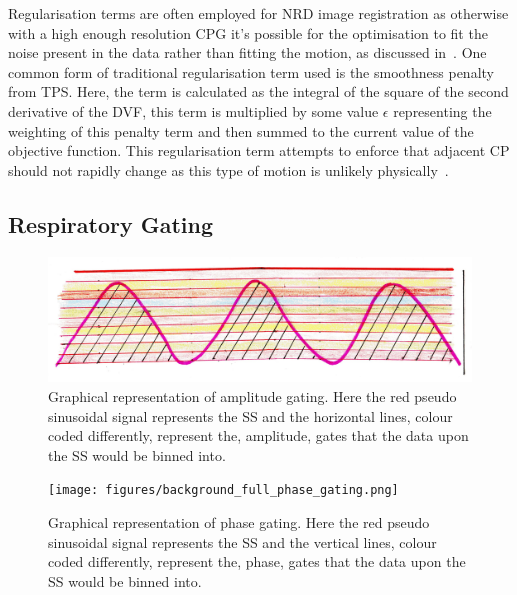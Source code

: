                 Regularisation terms are often employed for \gls{NRD} image registration as otherwise with a high enough resolution \gls{CPG} it's possible for the optimisation to fit the noise present in the data rather than fitting the motion, as discussed in~. One common form of traditional regularisation term used is the smoothness penalty from \gls{TPS}. Here, the term is calculated as the integral of the square of the second derivative of the \gls{DVF}, this term is multiplied by some value $\epsilon$ representing the weighting of this penalty term and then summed to the current value of the objective function. This regularisation term attempts to enforce that adjacent \gls{CP} should not rapidly change as this type of motion is unlikely physically~.
        
        \subsection{Respiratory Gating} \label{sec:respiratory_gating}
            
            \begin{figure}
                \centering
                    
                \includegraphics[width=1.0\linewidth]{figures/background_amplitude_gating.png}
                    
                \captionsetup{singlelinecheck=false, justification=raggedright}
                \caption{Graphical representation of amplitude gating. Here the red pseudo sinusoidal signal represents the \gls{SS} and the horizontal lines, colour coded differently, represent the, amplitude, gates that the data upon the \gls{SS} would be binned into.} \label{fig:respiratory_gating_ampliude_gating}
            \end{figure}
            
            \begin{figure}
                \centering
                    
                \texttt{[image: figures/background\_full\_phase\_gating.png]}
                    
                \captionsetup{singlelinecheck=false, justification=raggedright}
                \caption{Graphical representation of phase gating. Here the red pseudo sinusoidal signal represents the \gls{SS} and the vertical lines, colour coded differently, represent the, phase, gates that the data upon the \gls{SS} would be binned into.} \label{fig:respiratory_gating_full_phase_gating}
            \end{figure}
            
